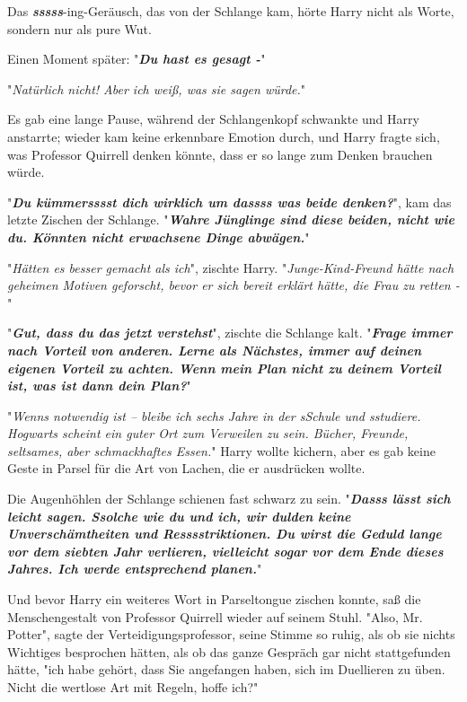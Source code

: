 {Das \textbf{\emph{sssss}}-ing-Geräusch, das von der Schlange kam, hörte Harry nicht als Worte, sondern nur als pure Wut.

Einen Moment später: "\textbf{\emph{Du hast es gesagt -}}"

"\emph{Natürlich nicht! Aber ich weiß, was sie sagen würde.}"

Es gab eine lange Pause, während der Schlangenkopf schwankte und Harry anstarrte; wieder kam keine erkennbare Emotion durch, und Harry fragte sich, was Professor Quirrell denken könnte, dass er so lange zum Denken brauchen würde.

"\textbf{\emph{Du kümmersssst dich wirklich um dassss was beide denken?}}", kam das letzte Zischen der Schlange. "\textbf{\emph{Wahre Jünglinge sind diese beiden, nicht wie du. Könnten nicht erwachsene Dinge abwägen.}}"

"\emph{Hätten es besser gemacht als ich}", zischte Harry. "\emph{Junge-Kind-Freund hätte nach geheimen Motiven geforscht, bevor er sich bereit erklärt hätte, die Frau zu retten -}"

"\textbf{\emph{Gut, dass du das jetzt verstehst}}", zischte die Schlange kalt. "\textbf{\emph{Frage immer nach Vorteil von anderen. Lerne als Nächstes, immer auf deinen eigenen Vorteil zu achten. Wenn mein Plan nicht zu deinem Vorteil ist, was ist dann dein Plan?}}"

"\emph{Wenns notwendig ist -- bleibe ich sechs Jahre in der sSchule und sstudiere. Hogwarts scheint ein guter Ort zum Verweilen zu sein. Bücher, Freunde, seltsames, aber schmackhaftes Essen.}" Harry wollte kichern, aber es gab keine Geste in Parsel für die Art von Lachen, die er ausdrücken wollte.

Die Augenhöhlen der Schlange schienen fast schwarz zu sein. "\textbf{\emph{Dasss lässt sich leicht sagen. Ssolche wie du und ich, wir dulden keine Unverschämtheiten und Resssstriktionen. Du wirst die Geduld lange vor dem siebten Jahr verlieren, vielleicht sogar vor dem Ende dieses Jahres. Ich werde entsprechend planen.}}"

Und bevor Harry ein weiteres Wort in Parseltongue zischen konnte, saß die Menschengestalt von Professor Quirrell wieder auf seinem Stuhl. "Also, Mr. Potter", sagte der Verteidigungsprofessor, seine Stimme so ruhig, als ob sie nichts Wichtiges besprochen hätten, als ob das ganze Gespräch gar nicht stattgefunden hätte, "ich habe gehört, dass Sie angefangen haben, sich im Duellieren zu üben. Nicht die wertlose Art mit Regeln, hoffe ich?"

}
